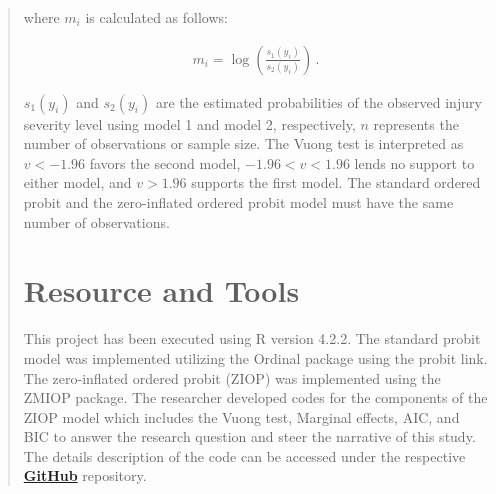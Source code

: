 \documentclass[12]{report}
\begin{document}
\begin{quote}
{where $m_i$ is calculated as follows:
\begin{fleqn}
\begin{align*}
 m_i = \log\left(\frac{s_1(y_i)}{s_2(y_i)}\right) \, .
 \tag{4.5.4}
\end{align*}
\end{fleqn}

\( s_1(y_i) \) and \( s_2(y_i) \) are the estimated probabilities of the observed injury severity level using model 1 and model 2, respectively, \( n \) represents the number of observations or sample size.
The Vuong test is interpreted as \( v < -1.96 \) favors the second model, \( -1.96 < v < 1.96 \) lends no support to either model, and \( v > 1.96 \) supports the first model. The standard ordered probit and the zero-inflated ordered probit model must have the same number of observations.


\section{Resource and Tools}

This project has been executed using R version 4.2.2. The standard probit model was implemented utilizing the Ordinal package using the probit link. The zero-inflated ordered probit (ZIOP) was implemented using the ZMIOP package. The researcher developed codes for the components of the ZIOP model which includes the Vuong test, Marginal effects, AIC, and BIC to answer the research question and steer the narrative of this study.
The details description of the code can be accessed under the respective \href{https://github.com/Ifeanyi-omeck/Collision_Severity_Model}{\textbf{GitHub}} repository.
   
\vspace{0.2cm}
}
\end{quote}
\end{document}
